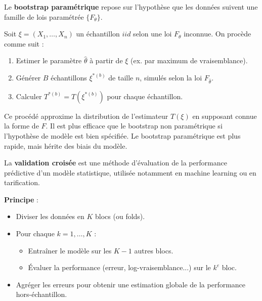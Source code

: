 \begin{f}
	
	Le \textbf{bootstrap paramétrique} repose sur l’hypothèse que les données suivent une famille de lois paramétrée \(\{F_\theta\}\).
	
	Soit \(\xi = (X_1, \ldots, X_n)\) un échantillon \(iid\) selon une loi \(F_\theta\) inconnue. On procède comme suit :
	\begin{enumerate}
		\item Estimer le paramètre \(\hat{\theta}\) à partir de \(\xi\) (ex. par maximum de vraisemblance).
		\item Générer \(B\) échantillons \(\xi^{\ast(b)}\) de taille \(n\), simulés selon la loi \(F_{\hat{\theta}}\).
		\item Calculer \(T^{\ast(b)} = T(\xi^{\ast(b)})\) pour chaque échantillon.
	\end{enumerate}
	
	Ce procédé approxime la distribution de l’estimateur \(T(\xi)\) en supposant connue la forme de \(F\). Il est plus efficace que le bootstrap non paramétrique si l’hypothèse de modèle est bien spécifiée. Le bootstrap paramétrique est plus rapide, mais hérite des biais du modèle.
	
\end{f}

\begin{f}
	
	La \textbf{validation croisée} est une méthode d’évaluation de la performance prédictive d’un modèle statistique, utilisée notamment en machine learning ou en tarification.
	
	\textbf{Principe} :
	\begin{itemize}
		\item Diviser les données en \(K\) blocs (ou folds).
		\item Pour chaque \(k = 1,\ldots,K\) :
		\begin{itemize}
			\item Entraîner le modèle sur les \(K-1\) autres blocs.
			\item Évaluer la performance (erreur, log-vraisemblance...) sur le \(k^e\) bloc.
		\end{itemize}
		\item Agréger les erreurs pour obtenir une estimation globale de la performance hors-échantillon.
	\end{itemize}
	
\end{f}

